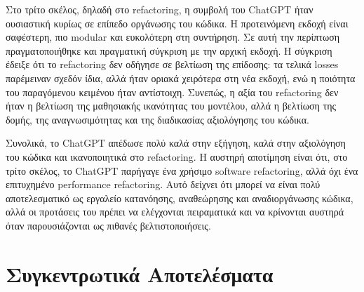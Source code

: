 \documentclass[11pt,a4paper]{article}
\begin{document}
Στο τρίτο σκέλος, δηλαδή στο \textlatin{refactoring}, η συμβολή του \textlatin{ChatGPT} ήταν ουσιαστική κυρίως
σε επίπεδο οργάνωσης του κώδικα. Η προτεινόμενη εκδοχή είναι σαφέστερη, πιο modular και ευκολότερη στη συντήρηση.
Σε αυτή την περίπτωση πραγματοποιήθηκε και πραγματική σύγκριση με την αρχική εκδοχή. Η σύγκριση έδειξε ότι
το \textlatin{refactoring} δεν οδήγησε σε βελτίωση της επίδοσης: τα τελικά \textlatin{losses} παρέμειναν σχεδόν ίδια,
αλλά ήταν οριακά χειρότερα στη νέα εκδοχή, ενώ η ποιότητα του παραγόμενου κειμένου ήταν αντίστοιχη. Συνεπώς,
η αξία του \textlatin{refactoring} δεν ήταν η βελτίωση της μαθησιακής ικανότητας του μοντέλου, αλλά η βελτίωση της
δομής, της αναγνωσιμότητας και της διαδικασίας αξιολόγησης του κώδικα.

Συνολικά, το \textlatin{ChatGPT} απέδωσε πολύ καλά στην εξήγηση, καλά στην αξιολόγηση του κώδικα και ικανοποιητικά
στο \textlatin{refactoring}. Η αυστηρή αποτίμηση είναι ότι, στο τρίτο σκέλος, το \textlatin{ChatGPT} παρήγαγε
ένα χρήσιμο \textlatin{software refactoring}, αλλά όχι ένα επιτυχημένο \textlatin{performance refactoring}.
Αυτό δείχνει ότι μπορεί να είναι πολύ αποτελεσματικό ως εργαλείο κατανόησης, αναθεώρησης και αναδιοργάνωσης
κώδικα, αλλά οι προτάσεις του πρέπει να ελέγχονται πειραματικά και να κρίνονται αυστηρά όταν παρουσιάζονται
ως πιθανές βελτιστοποιήσεις.

\newpage
{}
\section*{Συγκεντρωτικά Αποτελέσματα}
\end{document}
